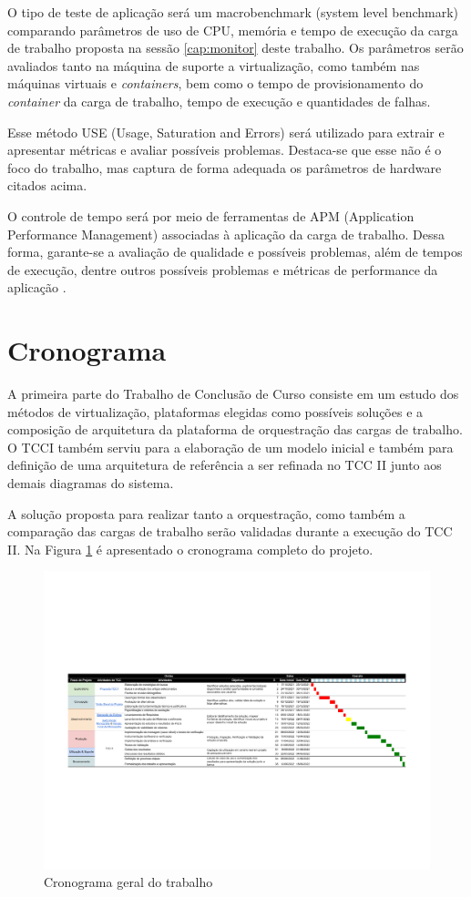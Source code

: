 O tipo de teste de aplicação será um macrobenchmark (system level benchmark) \cite{huge2008,scheepers2014virtualization} comparando parâmetros de uso de CPU, memória e tempo de execução da carga de trabalho proposta na sessão \ref{cap:monitor} deste trabalho. Os parâmetros serão avaliados tanto na máquina de suporte a virtualização, como também nas máquinas virtuais e  \emph{containers}, bem como o tempo de provisionamento do  \emph{container} da carga de trabalho, tempo de execução e quantidades de falhas.

Esse método USE (Usage, Saturation and Errors) \cite{greg2022} será utilizado para extrair e apresentar métricas e avaliar possíveis problemas. Destaca-se que esse não é o foco do trabalho, mas captura de forma adequada os parâmetros de hardware citados acima.

O controle de tempo será por meio de ferramentas de APM (Application Performance Management) associadas à aplicação da carga de trabalho. Dessa forma, garante-se a avaliação de qualidade e possíveis problemas, além de tempos de execução, dentre outros possíveis problemas e métricas de performance da aplicação \cite{tang2021systematical}.


\section{Cronograma}
A primeira parte do Trabalho de Conclusão de Curso consiste em um estudo dos métodos de virtualização, plataformas elegidas como possíveis soluções e a composição de arquitetura da plataforma de orquestração das cargas de trabalho. O TCCI também serviu para a elaboração de um modelo inicial e também para definição de uma arquitetura de referência a ser refinada no TCC II junto aos demais diagramas do sistema.

A solução proposta para realizar tanto a orquestração, como também a comparação das cargas de trabalho serão validadas durante a execução do TCC II.
Na Figura \ref{fig:cronograma} é apresentado o cronograma completo do projeto.

\begin{landscape}
\begin{figure}[!ht]
    \centering
    \includegraphics[width=\linewidth]{04-figuras/TCC cronograma - Sheet1.pdf}
    \caption{Cronograma geral do trabalho}
    \label{fig:cronograma}
\end{figure}
\end{landscape}